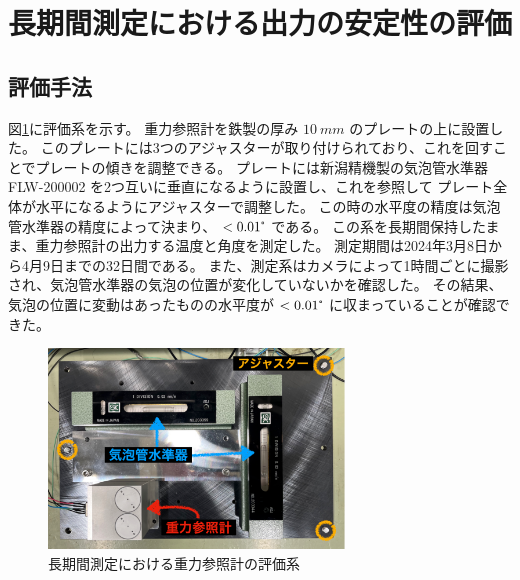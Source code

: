 \documentclass[../../main.tex]{subfiles}
\begin{document}
\section{長期間測定における出力の安定性の評価}
\subsection{評価手法}
図\ref{fig:timedrift_evaluation_system}に評価系を示す。
重力参照計を鉄製の厚み $\SI{10}{mm}$ のプレートの上に設置した。
このプレートには3つのアジャスターが取り付けられており、これを回すことでプレートの傾きを調整できる。
プレートには新潟精機製の気泡管水準器 FLW-200002 を2つ互いに垂直になるように設置し、これを参照して
プレート全体が水平になるようにアジャスターで調整した。
この時の水平度の精度は気泡管水準器の精度によって決まり、 $< 0.01\tcdegree$ である。
この系を長期間保持したまま、重力参照計の出力する温度と角度を測定した。
測定期間は2024年3月8日から4月9日までの32日間である。
また、測定系はカメラによって1時間ごとに撮影され、気泡管水準器の気泡の位置が変化していないかを確認した。
その結果、気泡の位置に変動はあったものの水平度が $< 0.01\tcdegree$ に収まっていることが確認できた。
\begin{figure}[H]
    \centering
    \includegraphics[width=0.7\textwidth]{tiltsensor/timedrift_evaluation_system.pdf}
    \caption{長期間測定における重力参照計の評価系}
    \label{fig:timedrift_evaluation_system}
\end{figure}
\end{document}
